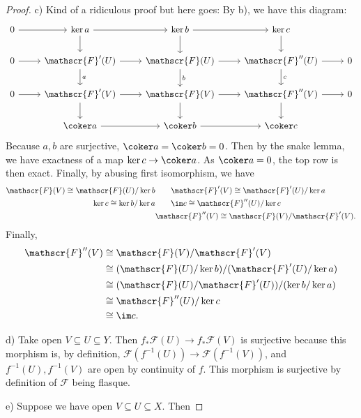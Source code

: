 \begin{proof}
	c) Kind of a ridiculous proof but here goes:
	By b), we have this diagram:
	\[\begin{tikzcd}
	0 & {\ker a} & {\ker b} & {\ker c} \\
	0 & {\mathscr{F}'(U)} & {\mathscr{F}(U)} & {\mathscr{F}''(U)} & 0 \\
	0 & {\mathscr{F}'(V)} & {\mathscr{F}(V)} & {\mathscr{F}''(V)} & 0 \\
	& {\coker a} & {\coker b} & {\coker c}
	\arrow[from=1-1, to=1-2]
	\arrow[from=1-2, to=1-3]
	\arrow[from=1-2, to=2-2]
	\arrow[from=1-3, to=1-4]
	\arrow[from=1-3, to=2-3]
	\arrow[from=1-4, to=2-4]
	\arrow[from=2-1, to=2-2]
	\arrow[from=2-2, to=2-3]
	\arrow["a", from=2-2, to=3-2]
	\arrow[from=2-3, to=2-4]
	\arrow["b", from=2-3, to=3-3]
	\arrow[from=2-4, to=2-5]
	\arrow["c", from=2-4, to=3-4]
	\arrow[from=3-1, to=3-2]
	\arrow[from=3-2, to=3-3]
	\arrow[from=3-2, to=4-2]
	\arrow[from=3-3, to=3-4]
	\arrow[from=3-3, to=4-3]
	\arrow[from=3-4, to=3-5]
	\arrow[from=3-4, to=4-4]
	\arrow[from=4-2, to=4-3]
	\arrow[from=4-3, to=4-4]
\end{tikzcd}\]
	Because $a,b $ are surjective, $\coker a = \coker b = 0 $.
	Then by the snake lemma, we have exactness of a map $\ker c \to \coker a $.
	As $\coker a = 0 $, the top row is then exact.
	Finally, by abusing first isomorphism, we have
	\begin{align*}
		\mathscr{F}(V) \cong \mathscr{F}(U) / \ker b &\qquad \mathscr{F}'(V) \cong \mathscr{F}'(U) / \ker a \\
		\ker c \cong \ker b / \ker a &\qquad \im c \cong \mathscr{F}''(U) / \ker c\\
					     & \mathscr{F}''(V) \cong \mathscr{F}(V) / \mathscr{F}'(V)
	.\end{align*}
	Finally,
	\begin{align*}
		\mathscr{F}''(V) &\cong \mathscr{F}(V) / \mathscr{F}'(V) \\&\cong (\mathscr{F}(U) / \ker b) / (\mathscr{F}'(U) / \ker a) \\&\cong (\mathscr{F}(U) / \mathscr{F}'(U)) / (\ker b / \ker a) \\&\cong \mathscr{F}''(U) / \ker c \\&\cong \im c
	.\end{align*}

	d) Take open $V \subseteq U \subseteq Y$.
	Then $f_\ast \mathscr{F}(U) \to f_\ast \mathscr{F}(V) $ is surjective because this morphism is, by definition, $\mathscr{F}(f^{-1}(U)) \to \mathscr{F}(f^{-1}(V)) $, and $f^{-1}(U),f^{-1}(V) $ are open by continuity of $f $.
	This morphism is surjective by definition of $\mathscr{F} $ being flasque.

	e) Suppose we have open $V \subseteq U \subseteq X $.
	Then
\end{proof}

